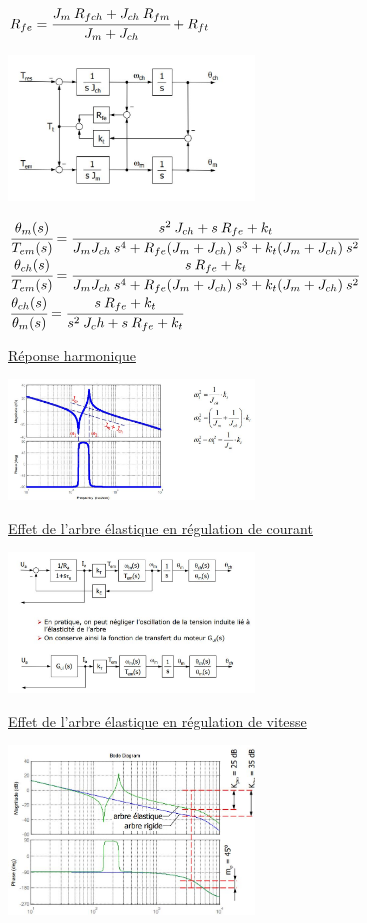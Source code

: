 \documentclass[	DIV=calc,%
							paper=a4,%
							fontsize=10pt,%
							twocolumn]{scrartcl} %
\newcommand{\formtitle}[1]{\large\underline{#1}}
\begin{document}
$R_{fe} = \cfrac{J_m \: R_{fch} + J_{ch}\:R_{fm}}{J_m + J_{ch}} + R_{ft}$


\includegraphics[width=0.49\textwidth]{img/arbre_elastique_3.JPG}

{\normalsize
$\cfrac{\theta_m(s)}{T_{em}(s)} = \cfrac{s^2\:J_{ch} + s\:R_{fe} + k_t}{J_mJ_{ch}\: s^4 + R_{fe}(J_m+J_{ch})\: s^3 + k_t(J_m+J_{ch}) \:s^2 }$\\


$\cfrac{\theta_{ch}(s)}{T_{em}(s)} = \cfrac{s\:R_{fe} + k_t}{J_mJ_{ch}\: s^4 + R_{fe}(J_m+J_{ch})\: s^3 + k_t(J_m+J_{ch}) \:s^2 }$\\


$\cfrac{\theta_{ch}(s)}{\theta_m(s)} = \cfrac{s\:R_{fe} + k_t}{s^2\: J_ch + s\:R_{fe} + k_t}$\\
}

\formtitle{Réponse harmonique}

\includegraphics[width=0.49\textwidth]{img/arbre_elastique_rep.JPG}


\formtitle{Effet de l’arbre élastique en régulation de courant}

\includegraphics[width=0.49\textwidth]{img/arbre_elastique_bloc.JPG}


\formtitle{Effet de l’arbre élastique en régulation de vitesse}

\includegraphics[width=0.49\textwidth]{img/arbre_elastique_vit.JPG}
\end{document}
